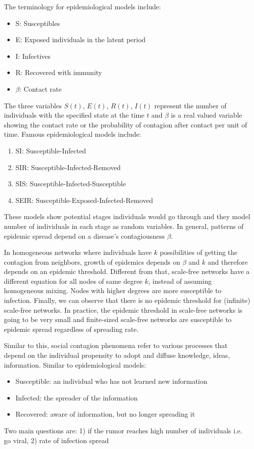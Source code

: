 \documentclass[11pt,a4paper]{article}
\begin{document}
The terminology for epidemiological models include:
\begin{itemize}
\item S: Susceptibles
\item E: Exposed individuals in the latent period
\item I: Infectives
\item R: Recovered with immunity
\item $\beta$: Contact rate
\end{itemize}
The three variables $S(t)$, $E(t)$, $R(t)$, $I(t)$ represent the number of individuals with the specified state at the time $t$ and $\beta$ is a real valued variable showing the contact rate or the probability of contagion after contact per unit of time.
Famous epidemiological models include:
\begin{enumerate}
\item SI: Susceptible-Infected \cite{newman}
\item SIR: Susceptible-Infected-Removed \cite{kermack}
\item SIS: Susceptible-Infected-Susceptible
\item SEIR: Susceptible-Exposed-Infected-Removed 
\end{enumerate}
These models show potential stages individuals would go through and they model number of individuals in each stage as random variables. In general, patterns of epidemic spread depend on a disease's contagiousness $\beta$.

In homogeneous networks where individuals have $k$ possibilities of getting the contagion from neighbors, growth of epidemics depends on $\beta$  and $k$ and therefore depends on an epidemic threshold. Different from that, scale-free networks have a different equation for all nodes of same degree $k$, instead of assuming homogeneous mixing. Nodes with higher degrees are more susceptible to infection. Finally, we can observe that there is no epidemic threshold for (infinite) scale-free networks. In practice, the epidemic threshold in scale-free networks is going to be very small and finite-sized scale-free networks are susceptible to epidemic spread regardless of spreading rate.

Similar to this, social contagion phenomena refer to various processes that depend on the individual propensity to adopt and diffuse knowledge, ideas, information. Similar to epidemiological models:
\begin{itemize}
\item Susceptible: an individual who has not learned new information
\item Infected: the spreader of the information
\item Recovered: aware of information, but no longer spreading it
\end{itemize}
Two main questions are: 1) if the rumor reaches high number of individuals i.e. go viral, 2) rate of infection spread
	
\end{document}
